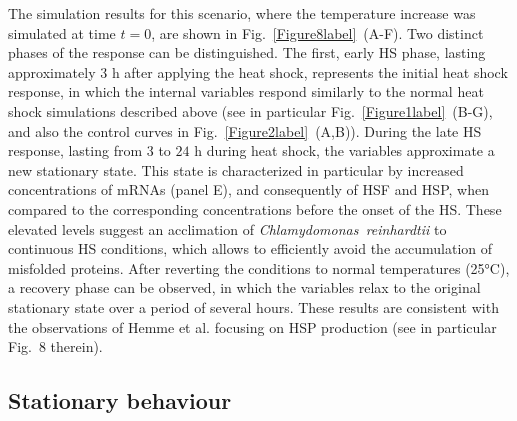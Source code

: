 \documentclass[oneside, 10pt, a4paper, twocolumn]{article}
\begin{document}
The simulation results for this scenario, where the temperature increase was simulated at time $t=0$, are shown in Fig.~\ref{Figure8label}~(A-F).
Two distinct phases of the response can be distinguished. The first, early HS phase, lasting approximately $3$ h after applying the heat shock, 
represents the initial heat shock response, in which the internal variables respond similarly to 
the normal heat shock simulations described above (see in particular Fig.~\ref{Figure1label}~(B-G), and also the control curves in Fig.~\ref{Figure2label}~(A,B)). 
During the late HS response, lasting from $3$ to $24$ h during heat shock, the variables approximate 
a new stationary state.  
This state is characterized in particular by increased concentrations of mRNAs (panel E), and consequently 
of HSF and HSP, when compared to the corresponding concentrations before the onset of the HS. 
These elevated levels suggest an acclimation of \textit{Chlamydomonas~reinhardtii} to continuous HS conditions,
which allows to efficiently avoid the accumulation of misfolded proteins.
After reverting the conditions to normal temperatures (25°C), a recovery phase can be observed, in which
the variables relax to the original stationary state over a period of several hours.
These results are consistent with the observations of Hemme et al. \cite{Hemme2014} focusing on HSP production (see in particular Fig.~8 therein).









\subsection{Stationary behaviour}
\label{SecSteadyStateConcentrations}
\end{document}
